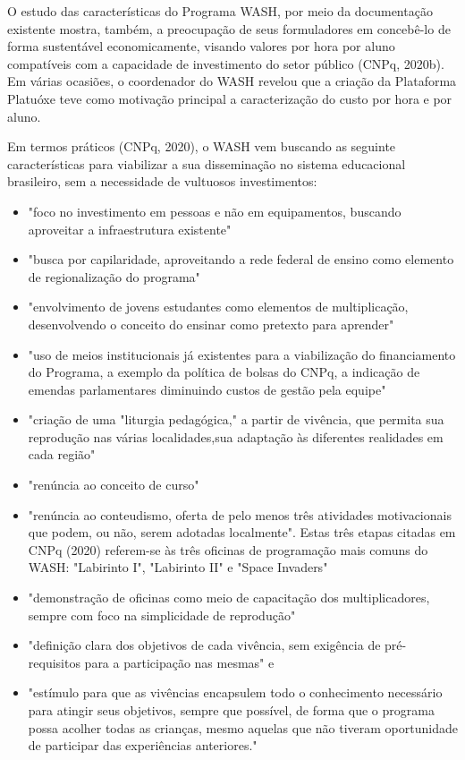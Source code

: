 O estudo das características do Programa WASH, por meio da documentação existente mostra, também, a preocupação de seus formuladores em concebê-lo de forma sustentável economicamente, visando valores por hora por aluno compatíveis com a capacidade de investimento do setor público  (CNPq, 2020b). Em várias ocasiões, o coordenador do WASH revelou que a criação da Plataforma Platuóxe teve como motivação principal a caracterização do custo por hora e por aluno.

Em termos práticos (CNPq, 2020), o WASH vem buscando as seguinte características para viabilizar a sua disseminação no sistema educacional brasileiro, sem a necessidade de vultuosos investimentos:


\begin{itemize}
\item "foco no investimento em pessoas e não em equipamentos, buscando aproveitar a infraestrutura existente"
\item "busca por capilaridade, aproveitando a rede federal de ensino como elemento de regionalização do programa"
\item "envolvimento de jovens estudantes como elementos de multiplicação, desenvolvendo o conceito do ensinar como pretexto para aprender"
\item "uso de meios institucionais já existentes para a viabilização do financiamento do Programa, a exemplo da política de bolsas do CNPq, a indicação de emendas parlamentares diminuindo custos de gestão pela equipe"
\item "criação de uma  "liturgia pedagógica," a partir de vivência, que permita sua reprodução nas várias localidades,sua adaptação às diferentes realidades em cada região"
\item "renúncia ao conceito de curso"
\item "renúncia ao conteudismo, oferta de pelo menos três atividades motivacionais que podem, ou não, serem adotadas localmente". Estas três etapas citadas em  CNPq (2020) referem-se às três oficinas de programação mais comuns do WASH: "Labirinto I", "Labirinto II" e "Space Invaders"
\item "demonstração de oficinas como meio de capacitação dos multiplicadores, sempre com foco na simplicidade de reprodução"
\item "definição clara dos objetivos de cada vivência, sem exigência de pré-requisitos para a participação nas mesmas" e
\item "estímulo para que as vivências encapsulem todo o conhecimento necessário para  atingir  seus objetivos, sempre que possível, de forma que o programa possa acolher todas as crianças, mesmo aquelas que não tiveram oportunidade de participar das experiências anteriores."
\end{itemize}

